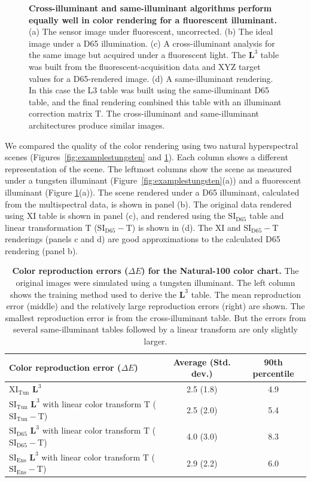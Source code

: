 \documentclass[]{spie}
\newcommand{\Lcube}{\boldsymbol L^3}
\newcommand{\XI}{\mathrm{XI}}
\newcommand{\XIT}{\mathrm{XI_{Tun}}}
\newcommand{\SIT}{\mathrm{SI_{Tun}}}
\newcommand{\SID}{\mathrm{SI_{D65}}}
\newcommand{\SIE}{\mathrm{SI_{Ens}}}
\newcommand{\SITT}{\mathrm{SI_{Tun}-T}}
\newcommand{\SIDT}{\mathrm{SI_{D65}-T}}
\newcommand{\SIET}{\mathrm{SI_{Ens}-T}}
\newcommand{\TT}{\mathrm{T}}
\begin{document}
\begin{figure}[t]
\begin{center}
\begin{minipage}[b]{0.245\textwidth}
 \centering\small\text{(d) $\SIDT$}
\end{minipage}
\end{center}
\caption{\textbf{Cross-illuminant and same-illuminant algorithms perform equally well in color rendering for a fluorescent illuminant.} (a) The sensor image under fluorescent, uncorrected. (b) The ideal image under a D65 illumination. (c) A cross-illuminant analysis for the same image but acquired under a fluorescent light. The $\Lcube$ table was built from the fluorescent-acquisition data and XYZ target values for a D65-rendered image. (d) A same-illuminant rendering. In this case the L3 table was built using the same-illuminant D65 table, and the final rendering combined this table with an illuminant correction matrix $\TT$. The cross-illuminant and same-illuminant architectures produce similar images.}
\label{fig:examplesfluorescent}
\end{figure}

We compared the quality of the color rendering using two natural hyperspectral scenes (Figures~\ref{fig:examplestungsten} and \ref{fig:examplesfluorescent}). Each column shows a different representation of the scene. The leftmost columns show the scene as measured under a tungsten illuminant (Figure~\ref{fig:examplestungsten}(a)) and a fluorescent illuminant (Figure \ref{fig:examplesfluorescent}(a)). The scene rendered under a D65 illuminant, calculated from the multispectral data, is shown in panel (b). The original data rendered using $\XI$ table is shown in panel (c), and rendered using the $\SID$ table and linear transformation $\TT$ ($\SIDT$) is shown in (d). The $\XI$ and $\SIDT$ renderings (panels c and d) are good approximations to the calculated D65 rendering (panel b).

\begin {table}[b]
\begin{center}
\begin{tabular}{|l|c|c|}
\hline 
Color reproduction error ($\Delta E$) & Average (Std. dev.) & 90th percentile \\ \hline 
$\XIT$ $\Lcube$ & 2.5 (1.8) & 4.9 \\ 
$\SIT$ $\Lcube$ with linear color transform $\TT$ ($\SITT$) & 2.5 (2.0) & 5.4 \\ 
$\SID$ $\Lcube$ with linear color transform $\TT$ ($\SIDT$) & 4.0 (3.0) & 8.3 \\
$\SIE$ $\Lcube$ with linear color transform $\TT$ ($\SIET$) & 2.9 (2.2) & 6.0 \\\hline 
\end{tabular} 
\end{center}\caption{\textbf{Color reproduction errors ($\Delta E$) for the Natural-100 color chart.} The original images were simulated using a tungsten illuminant. The left column shows the training method used to derive the $\Lcube$ table. The mean reproduction error (middle) and the relatively large reproduction errors (right) are shown. The smallest reproduction error is from the cross-illuminant table. But the errors from several same-illuminant tables followed by a linear transform are only slightly larger.} 
\label{tab:colorErrorTable} 
\end{table}
\end{document}
